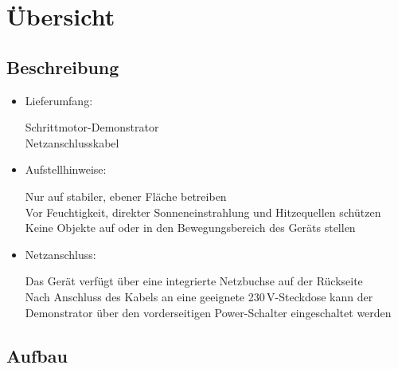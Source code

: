\documentclass[a4paper,12pt]{report}
\begin{document}
	\chapter{Übersicht}
	\section{Beschreibung}
	\begin{itemize}[leftmargin=1.5em]
		Der Demonstrator veranschaulicht die typischen Bewegungsabläufe eines Schrittmotors anhand eines Linearschlittens. Dieser bewegt sich auf einer Linearführung und wird über einen Trapezgewindespindel (Leitspindel) mit einem NEMA17-Schrittmotor angetrieben. Der Antrieb erfolgt dabei in fünf verschiedenen Geschwindigkeitsstufen, die mithilfe eines Drehencoders auswählbar sind. Die ausgewählte Stufe wird über ein OLED-Display angezeigt, die Systemzustände über eine farbige Status-LED signalisiert. Das Gerät ist so konzipiert, dass es sich einfach auf einer stabilen, ebenen Fläche betreiben lässt.  
		
		\item Lieferumfang: 
		
		Schrittmotor-Demonstrator\\
		
		Netzanschlusskabel\\
		
		\item Aufstellhinweise: 
		
		Nur auf stabiler, ebener Fläche betreiben\\
		Vor Feuchtigkeit, direkter Sonneneinstrahlung und Hitzequellen schützen\\
		
		Keine Objekte auf oder in den Bewegungsbereich des Geräts stellen\\
		
		\item Netzanschluss: 
		
		Das Gerät verfügt über eine integrierte Netzbuchse auf der Rückseite\\
		
		Nach Anschluss des Kabels an eine geeignete 230 V-Steckdose kann der Demonstrator über den vorderseitigen Power-Schalter eingeschaltet werden\\
		
	\end{itemize}
	\section {Aufbau}
\end{document}
